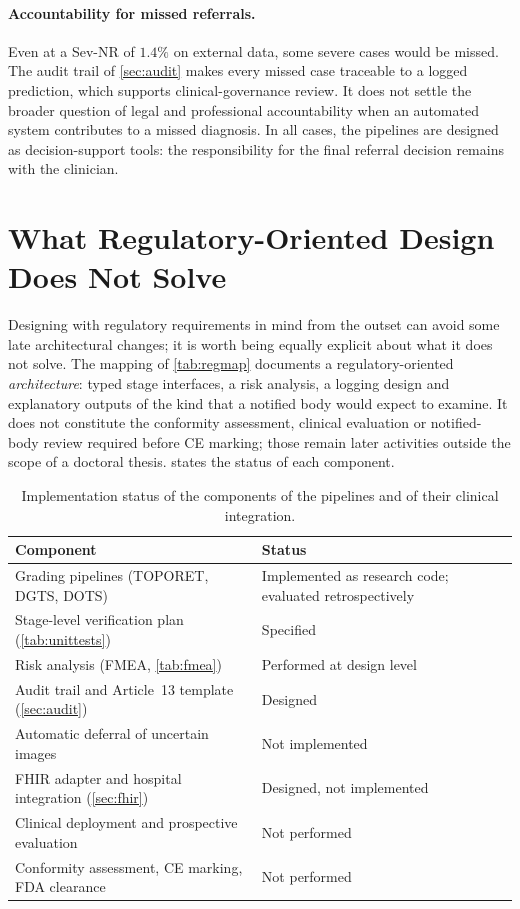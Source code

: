 \paragraph{Accountability for missed referrals.}
Even at a Sev-NR of $1.4\%$ on external data, some severe cases would be missed. The
audit trail of \cref{sec:audit} makes every missed case traceable to a logged prediction,
which supports clinical-governance review. It does not settle the broader question of
legal and professional accountability when an automated system contributes to a missed
diagnosis. In all cases, the pipelines are designed as decision-support tools: the
responsibility for the final referral decision remains with the clinician.

\section{What Regulatory-Oriented Design Does Not Solve}
\label{sec:regnotsolve}

Designing with regulatory requirements in mind from the outset can avoid some late
architectural changes; it is worth being equally explicit about what it does not solve.
The mapping of \cref{tab:regmap} documents a regulatory-oriented \emph{architecture}: typed
stage interfaces, a risk analysis, a logging design and explanatory outputs of the kind that
a notified body would expect to examine. It does not constitute the conformity
assessment, clinical evaluation or notified-body review required before CE marking; those
remain later activities outside the scope of a doctoral thesis.  states
the status of each component.

\begin{table}[!htbp]
\centering
\caption[Implementation status of the components]{Implementation status of the components
of the pipelines and of their clinical integration.}
\label{tab:status}
\small
\begin{tabular}{@{}P{6.6cm}P{7.4cm}@{}}
\toprule
Component & Status \\
\midrule
Grading pipelines (TOPORET, DGTS, DOTS) & Implemented as research code; evaluated retrospectively \\
Stage-level verification plan (\cref{tab:unittests}) & Specified \\
Risk analysis (FMEA, \cref{tab:fmea}) & Performed at design level \\
Audit trail and Article~13 template (\cref{sec:audit}) & Designed \\
Automatic deferral of uncertain images & Not implemented \\
FHIR adapter and hospital integration (\cref{sec:fhir}) & Designed, not implemented \\
Clinical deployment and prospective evaluation & Not performed \\
Conformity assessment, CE marking, FDA clearance & Not performed \\
\bottomrule
\end{tabular}
\end{table}


